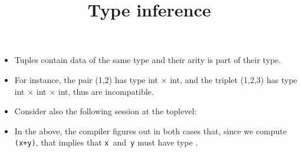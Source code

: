 \documentclass[wide]{slides}
\begin{document}
\begin{slide}
  \title{Type inference}

  \begin{itemize}

    \item Tuples contain data of the same type and their arity is part
      of their type.

    \item For instance, the pair \textsf{(1,2)} has type \textsf{int}
      $\times$ \textsf{int}, and the triplet \textsf{(1,2,3)} has type
      \textsf{int} $\times$ \textsf{int} $\times$ \textsf{int}, thus
      are incompatible.

    \item Consider also the following session at the \OCaml
      toplevel:
      \medskip

      \noindent{}

      \noindent{}

      \medskip

      \noindent{}

      \noindent{}

      \smallskip

    \item In the above, the \OCaml compiler figures out in both cases
      that, since we compute \texttt{(x+y)}, that implies that
      \texttt{x}~and~\texttt{y} must have type .
  \end{itemize}

\end{slide}
\end{document}
